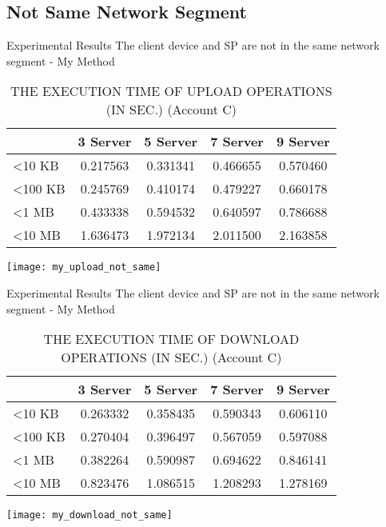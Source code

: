 \subsection{Not Same Network Segment}
\begin{frame}{Experimental Results}
{The client device and SP are \alert{not} in the same network segment - My Method}
	\scriptsize
    \begin{table}[]
    \centering
    \caption{THE EXECUTION TIME OF \alert{UPLOAD} OPERATIONS (IN SEC.) (Account C)}
    \begin{tabular}{lcccc}
                         & 3 Server & 5 Server & 7 Server & 9 Server \\ \hline
        \textless 10 KB  & 0.217563 & 0.331341 & 0.466655 & 0.570460 \\ \hline
        \textless 100 KB & 0.245769 & 0.410174 & 0.479227 & 0.660178 \\ \hline
        \textless 1 MB   & 0.433338 & 0.594532 & 0.640597 & 0.786688 \\ \hline
        \textless 10 MB  & 1.636473 & 1.972134 & 2.011500 & 2.163858 \\ \hline
    \end{tabular}
    \end{table}
    \begin{center}
		\texttt{[image: my\_upload\_not\_same]}
    \end{center}
\end{frame}

\begin{frame}{Experimental Results}
{The client device and SP are \alert{not} in the same network segment - My Method}
	\scriptsize
    \begin{table}[]
    \centering
    \caption{THE EXECUTION TIME OF \alert{DOWNLOAD} OPERATIONS (IN SEC.) (Account C)}
    \begin{tabular}{lcccc}
                         & 3 Server & 5 Server & 7 Server & 9 Server \\ \hline
        \textless 10 KB  & 0.263332 & 0.358435 & 0.590343 & 0.606110 \\ \hline
        \textless 100 KB & 0.270404 & 0.396497 & 0.567059 & 0.597088 \\ \hline
        \textless 1 MB   & 0.382264 & 0.590987 & 0.694622 & 0.846141 \\ \hline
        \textless 10 MB  & 0.823476 & 1.086515 & 1.208293 & 1.278169 \\ \hline
    \end{tabular}
    \end{table}
    \begin{center}
		\texttt{[image: my\_download\_not\_same]}
    \end{center}
\end{frame}

